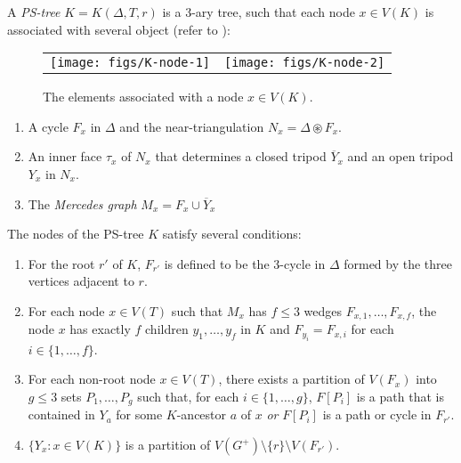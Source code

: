 \documentclass{patmorin}
\renewcommand{\proplabel}[1]{\label{prop:#1}}
\begin{document}
A \emph{PS-tree}  $K=K(\Delta, T, r)$ is a 3-ary tree, such that each node $x\in V(K)$ is associated with several object (refer to ):

\begin{figure}
  \begin{center}
    \begin{tabular}{cc}
      \texttt{[image: figs/K-node-1]} &
      \texttt{[image: figs/K-node-2]}
    \end{tabular}
  \end{center}
  \caption{The elements associated with a node $x\in V(K)$.}
\end{figure}

\begin{enumerate}
  \item A cycle $F_x$ in $\Delta$ and the near-triangulation $N_x=\Delta\circledast F_x$.
  
  \item An inner face $\tau_x$ of $N_x$ that determines a closed tripod $\overline{Y}_x$ and an open tripod $Y_x$ in $N_x$.
  
  \item The \emph{Mercedes graph} $M_x=F_x\cup \overline{Y}_x$
\end{enumerate}

The nodes of the PS-tree $K$ satisfy several conditions:
\begin{enumerate}[(PR1)]
  \item For the root $r'$ of $K$, $F_{r'}$ is defined to be the 3-cycle in $\Delta$ formed by the three vertices adjacent to $r$.
  
  \item \proplabel{children} For each node $x\in V(T)$ such that $M_x$ has $f\le 3$ wedges $F_{x,1},\ldots,F_{x,f}$, the node $x$ has exactly $f$ children $y_1,\ldots,y_f$ in $K$ and $F_{y_i} = F_{x,i}$ for each $i\in\{1,\ldots,f\}$.
  
  \item \proplabel{ancestor-boundary} For each non-root node $x\in V(T)$, there exists a partition of $V(F_x)$ into $g\le 3$ sets $P_1,\ldots,P_g$ such that, for each $i\in\{1,\ldots,g\}$, $F[P_i]$ is a path that is contained in $Y_a$ for some $K$-ancestor $a$ of $x$ \emph{or} $F[P_i]$ is a path or cycle in $F_{r'}$.

  \item \proplabel{partition} $\{Y_x : x\in V(K)\}$ is a partition of $V(G^+)\setminus\{r\}\setminus V(F_{r'})$.
\end{enumerate}
\end{document}

